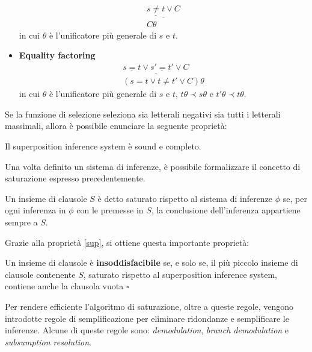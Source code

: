 \begin{definition}
\begin{itemize}
\begin{equation}
\begin{gathered}
                \underline{\underline{s\neq t} \lor C}\\
                C\theta
            \end{gathered}
        \end{equation}
        in cui $\theta$ è l'unificatore più generale di $s$ e $t$.
        \item \textbf{Equality factoring}
        \begin{equation}
            \begin{gathered}
                \underline{\underline{s=t} \lor \underline{s'=t'}\lor C}\\
                (s=t \lor t\neq t' \lor C)\theta
            \end{gathered}
        \end{equation}
        in cui $\theta$ è l'unificatore più generale di $s$ e $t$, $t\theta \prec s\theta$ e $t'\theta\prec t\theta$.
    \end{itemize}
\end{definition}
Se la funzione di selezione seleziona sia letterali negativi sia tutti i letterali massimali, allora è possibile enunciare la seguente proprietà: 
\begin{property}\label{sup}
    Il superposition inference system è sound e completo.
\end{property}
Una volta definito un sistema di inferenze, è possibile formalizzare il concetto di saturazione espresso precedentemente.
\begin{definition}
    Un insieme di clausole $S$ è detto saturato rispetto al sistema di inferenze $\phi$ se, 
    per ogni inferenza in $\phi$ con le premesse in $S$, la conclusione dell'inferenza appartiene sempre
    a $S$. 
\end{definition}
Grazie alla proprietà \ref{sup}, si ottiene questa importante proprietà:
\begin{property}
    Un insieme di clausole è \textbf{insoddisfacibile} se, e solo se, il più piccolo insieme di clausole contenente $S$, saturato 
    rispetto al superposition inference system, contiene anche la clausola vuota $\square$
\end{property}

Per rendere efficiente l'algoritmo di saturazione, oltre a queste regole, vengono introdotte
regole di semplificazione per eliminare ridondanze e semplificare le inferenze. Alcune di queste regole sono: \emph{demodulation},
\emph{branch demodulation} e \emph{subsumption resolution}. 

